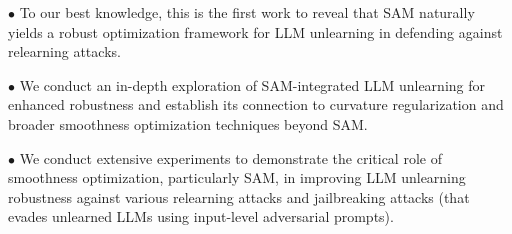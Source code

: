 

$\bullet$ To our best knowledge, this is the first work to reveal that SAM naturally yields a robust optimization framework for LLM unlearning in defending against relearning attacks.

$\bullet$ We conduct an in-depth exploration of SAM-integrated LLM unlearning for enhanced robustness and establish its connection to curvature regularization and broader smoothness optimization techniques beyond SAM.

$\bullet$ We conduct extensive experiments to demonstrate the critical role of smoothness optimization, particularly SAM, in improving LLM unlearning robustness against various relearning attacks and jailbreaking attacks (that evades unlearned LLMs using input-level adversarial prompts).


 





